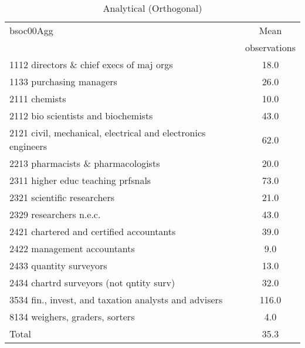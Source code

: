 \begin{table}
	\centering
	\caption{Analytical (Orthogonal)}
	\begin{tabular}{lc}
	\toprule	
		
bsoc00Agg&Mean \\
&observations \\
\hline
1112 directors \& chief execs of maj orgs&18.0 \\
1133 purchasing managers&26.0 \\
2111 chemists&10.0 \\
2112 bio scientists and biochemists&43.0 \\
2121 civil, mechanical, electrical and electronics engineers&62.0 \\
2213 pharmacists \& pharmacologists&20.0 \\
2311 higher educ teaching prfsnals&73.0 \\
2321 scientific researchers&21.0 \\
2329 researchers n.e.c.&43.0 \\
2421 chartered and certified accountants&39.0 \\
2422 management accountants&9.0 \\
2433 quantity surveyors&13.0 \\
2434 chartrd surveyors (not qntity surv)&32.0 \\
3534 fin., invest, and taxation analysts and advisers&116.0 \\
8134 weighers, graders, sorters&4.0 \\
Total&35.3 \\
\bottomrule
\bottomrule
\end{tabular}
\end{table}
